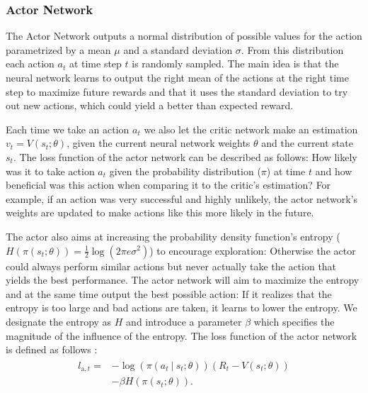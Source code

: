 \documentclass[10pt,sigconf,anonymous]{acmart}
\newcommand\givenbase[1][]{\:#1\lvert\:}
\let\given\givenbase
\begin{document}
\subsubsection{Actor Network}
\label{subsubsec:genericactor}

The Actor Network outputs a normal distribution of possible values for the action parametrized by a mean $\mu$ and a standard deviation $\sigma$. From this distribution each action $a_t$ at time step $t$ is randomly sampled. The main idea is that the neural network learns to output the right mean of the actions at the right time step to maximize future rewards and that it uses the standard deviation to try out new actions, which could yield a better than expected reward. 

Each time we take an action $a_t$ we also let the critic network make an estimation $v_t = V(s_t; \theta)$, given the current neural network weights $\theta$ and the current state $s_t$. The loss function of the actor network can be described as follows: How likely was it to take action $a_t$ given the probability distribution ($\pi$) at time $t$ and how beneficial was this action when comparing it to the critic's estimation? For example, if an action was very successful and highly unlikely, the actor network's weights are updated to make actions like this more likely in the future. 

The actor also aims at increasing the probability density function's entropy ($H( \pi( s_t; \theta )) = \frac{1}{2} \log ( 2 \pi e \sigma^2 )$) to encourage exploration: Otherwise the actor could always perform similar actions but never actually take the action that yields the best performance. The actor network will aim to maximize the entropy and at the same time output the best possible action: If it realizes that the entropy is too large and bad actions are taken, it learns to lower the entropy. We designate the entropy as $H$ and introduce a parameter $\beta$ which specifies the magnitude of the influence of the entropy. The loss function of the actor network is defined as follows \cite{mnih_asynchronous_2016}:
\begin{align}
\begin{split}
l_{\text{a},t} =& -\log \left( \pi\left( a_t \given s_t; \theta \right)\right)\left( R_t - V(s_t; \theta) \right)\\ 
&- \beta H\left( \pi\left( s_t; \theta \right)\right).
\end{split}
\end{align}
\end{document}
